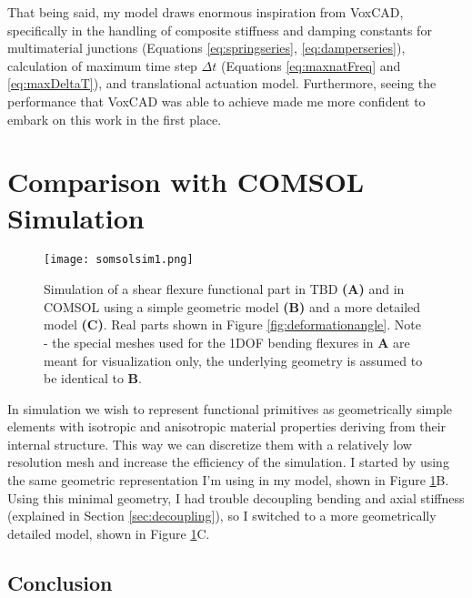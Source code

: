 {That being said, my model draws enormous inspiration from VoxCAD, specifically in the handling of composite stiffness and damping constants for multimaterial junctions (Equations \ref{eq:springseries}, \ref{eq:damperseries}), calculation of maximum time step $\Delta t$ (Equations \ref{eq:maxnatFreq} and \ref{eq:maxDeltaT}), and translational actuation model.  Furthermore, seeing the performance that VoxCAD was able to achieve made me more confident to embark on this work in the first place. 

\section{Comparison with COMSOL Simulation}

\begin{figure}
  \texttt{[image: somsolsim1.png]}
  \caption{Simulation of a shear flexure functional part in TBD \textbf{(A)} and in COMSOL using a simple geometric model \textbf{(B)} and a more detailed model \textbf{(C)}.  Real parts shown in Figure \ref{fig:deformationangle}.  Note - the special meshes used for the 1DOF bending flexures in \textbf{A} are meant for visualization only, the underlying geometry is assumed to be identical to \textbf{B}.}
  \label{fig:somsolsim1}
\end{figure}

In simulation we wish to represent functional primitives as geometrically simple elements with isotropic and anisotropic material properties deriving from their internal structure.  This way we can discretize them with a relatively low resolution mesh and increase the efficiency of the simulation.  I started by using the same geometric representation I'm using in my model, shown in Figure \ref{fig:somsolsim1}B. Using this minimal geometry, I had trouble decoupling bending and axial stiffness (explained in Section \ref{sec:decoupling}), so I switched to a more geometrically detailed model, shown in Figure \ref{fig:somsolsim1}C.\\


\subsection{Conclusion}

}
